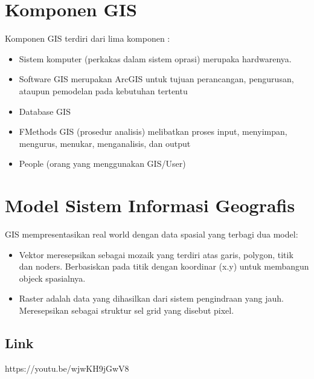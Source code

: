 \section{Komponen GIS}
    \item Komponen GIS terdiri dari lima komponen :
     \begin{itemize}
	\item Sistem komputer (perkakas dalam sistem oprasi) merupaka hardwarenya.
	\item Software GIS merupakan ArcGIS untuk tujuan perancangan, pengurusan, ataupun pemodelan pada kebutuhan tertentu 
	\item Database GIS 
	\item FMethods GIS (prosedur analisis) melibatkan proses input, menyimpan, mengurus, menukar, menganalisis, dan output
	\item People (orang yang menggunakan GIS/User)
	\end{itemize}
\section{Model Sistem Informasi Geografis}
    \item GIS mempresentasikan real world dengan data spasial yang terbagi dua model:
    \begin{itemize}
    \item Vektor meresepsikan sebagai mozaik yang terdiri atas garis, polygon, titik dan noders. Berbasiskan pada titik dengan koordinar (x.y) untuk membangun objeck spasialnya.
    \item Raster adalah data yang dihasilkan dari sistem pengindraan yang jauh. Meresepsikan sebagai struktur sel grid yang disebut pixel.
    \end{itemize}

\subsection{Link}
https://youtu.be/wjwKH9jGwV8

